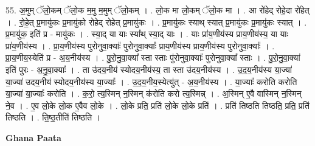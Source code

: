 \documentclass[17pt]{extarticle}
\begin{document}
55. अ॒मुम् ॅलो॒कम् ॅलो॒क म॒मु म॒मुम् ॅलो॒कम् । . लो॒क मा लो॒कम् ॅलो॒क मा । . आ रो॑हेद् रोहे॒दा रो॑हेत् । . रो॒हे॒त् प्र॒मायु॑कः प्र॒मायु॑को रोहेद् रोहेत् प्र॒मायु॑कः । . प्र॒मायु॑कः स्याथ् स्यात् प्र॒मायु॑कः प्र॒मायु॑कः स्यात् । . प्र॒मायु॑क॒ इति॑ प्र - मायु॑कः । . स्या॒द् या याः स्या᳚थ् स्या॒द् याः । . याः प्रा॑य॒णीय॑स्य प्राय॒णीय॑स्य॒ या याः प्रा॑य॒णीय॑स्य । . प्रा॒य॒णीय॑स्य पुरोनुवा॒क्याः᳚ पुरोनुवा॒क्याः᳚ प्राय॒णीय॑स्य प्राय॒णीय॑स्य पुरोनुवा॒क्याः᳚ । . प्रा॒य॒णीय॒स्येति॑ प्र - अ॒य॒नीय॑स्य । . पु॒रो॒नु॒वा॒क्या᳚ स्ता स्ताः पु॑रोनुवा॒क्याः᳚ पुरोनुवा॒क्या᳚ स्ताः । . पु॒रो॒नु॒वा॒क्या॑ इति॑ पुरः - अ॒नु॒वा॒क्याः᳚ । . ता उ॑दय॒नीय॑ स्योदय॒नीय॑स्य॒ ता स्ता उ॑दय॒नीय॑स्य । . उ॒द॒य॒नीय॑स्य या॒ज्या॑ या॒ज्या॑ उदय॒नीय॑ स्योदय॒नीय॑स्य या॒ज्याः᳚ । . उ॒द॒य॒नीय॒स्येत्यु॑त् - अ॒य॒नीय॑स्य । . या॒ज्याः᳚ करोति करोति या॒ज्या॑ या॒ज्याः᳚ करोति । . क॒रो॒ त्य॒स्मिन् न॒स्मिन् क॑रोति करो त्य॒स्मिन्न् । . अ॒स्मिन् ए॒वै वास्मिन् न॒स्मिन् ने॒व । . ए॒व लो॒के लो॒क ए॒वैव लो॒के । . लो॒के प्रति॒ प्रति॑ लो॒के लो॒के प्रति॑ । . प्रति॑ तिष्ठति तिष्ठति॒ प्रति॒ प्रति॑ तिष्ठति । . ति॒ष्ठ॒तीति॑ तिष्ठति । \newline

\textbf{Ghana Paata } \newline
\end{document}

